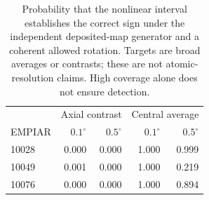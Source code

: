 \begin{table}[t]
\centering
\caption{Probability that the nonlinear interval establishes the correct sign under the independent deposited-map generator and a coherent allowed rotation. Targets are broad averages or contrasts; these are not atomic-resolution claims. High coverage alone does not ensure detection.}
\label{tab:power}
\begin{tabular}{lrrrr}
\toprule
 & \multicolumn{2}{c}{Axial contrast} & \multicolumn{2}{c}{Central average} \\
EMPIAR & $0.1^\circ$ & $0.5^\circ$ & $0.1^\circ$ & $0.5^\circ$ \\
\midrule
10028 & 0.000 & 0.000 & 1.000 & 0.999 \\
10049 & 0.001 & 0.000 & 1.000 & 0.219 \\
10076 & 0.000 & 0.000 & 1.000 & 0.894 \\
\bottomrule
\end{tabular}
\end{table}
